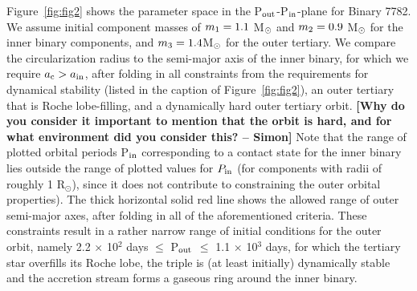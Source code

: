 \documentclass{aastex62}
\def\simon#1{{\bf {\color{red}[#1 -- Simon]}}}
\begin{document}
Figure~\ref{fig:fig2} shows the parameter space in the P$_{\rm
  out}$-P$_{\rm in}$-plane for Binary 7782.  We assume initial
component masses of $m_{\rm 1} = 1.1$ M$_{\rm \odot}$ and $m_{\rm 2} =
0.9$ M$_{\rm \odot}$ for the inner binary components, and $m_{\rm 3} =
1.4 $M$_{\rm \odot}$ for the outer tertiary.  We compare the
circularization radius to the semi-major axis of the inner binary, for
which we require $a_{\rm c} > a_{\rm in}$, after folding in all
constraints from the requirements for dynamical stability (listed in
the caption of Figure~\ref{fig:fig2}), an outer tertiary that is Roche
lobe-filling, and a dynamically hard outer tertiary orbit.  \simon{Why
  do you consider it important to mention that the orbit is hard, and
  for what environment did you consider this?}  Note that the range of
plotted orbital periods P$_{\rm in}$ corresponding to a contact state
for the inner binary lies outside the range of plotted values for
$P_{\rm in}$ (for components with radii of roughly 1 R$_{\odot}$),
since it does not contribute to constraining the outer orbital
properties).  The thick horizontal solid red line shows the allowed
range of outer semi-major axes, after folding in all of the
aforementioned criteria.  These constraints result in a rather narrow
range of initial conditions for the outer orbit, namely 2.2 $\times$
10$^{2}$ days $\le$ P$_{\rm out}$ $\le$ 1.1 $\times$ 10$^3$ days, for
which the tertiary star overfills its Roche lobe, the triple is (at
least initially) dynamically stable and the accretion stream forms a
gaseous ring around the inner binary.
\end{document}
